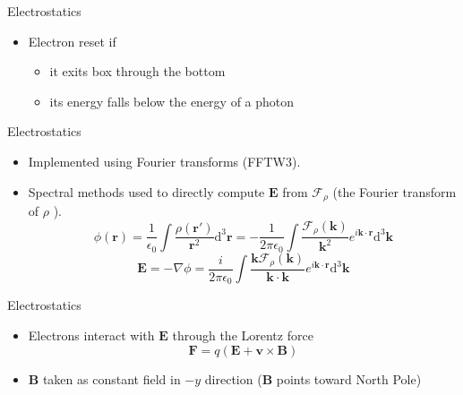 \documentclass[xcolor=pdftex,dvipsnames,table,usenames,11pt]{beamer}
\renewcommand{\vec}[1]{\ensuremath{\mathbf{#1}}}
\begin{document}
\begin{frame}{Electrostatics}
\begin{itemize}
\item Electron reset if
\begin{itemize}
\item it exits box through the bottom
\item its energy falls below the energy of a photon
\end{itemize}
\end{itemize}
\end{frame}

























\begin{frame}{Electrostatics}
\begin{itemize}
\item Implemented using Fourier transforms (FFTW3).
\item Spectral methods used to directly compute $\vec E$ from $\mathcal{F}_\rho$ (the Fourier transform of $\rho$ ).
\begin{equation*}
\phi(\vec r) = \frac{1}{\epsilon_0}\int{\frac{\rho(\vec r') }{\vec r^2  } \mathrm{d} ^3\vec r} = -\frac{1}{2\pi\epsilon_0}\int{ \frac{\mathcal{F}_\rho (\vec k)}{\vec k^2}e^{i\vec k\cdot\vec r }\mathrm{d}^3\vec k    }
\end{equation*}
\begin{equation*}
\vec E = -\nabla \phi  = \frac{i}{2\pi\epsilon_0}\int{   \frac{\vec k \mathcal{F}_\rho (\vec k)}{\vec k \cdot \vec k}e^{i\vec k\cdot\vec r }\mathrm{d}^3\vec k       }
\end{equation*}
\end{itemize}
\end{frame}











\begin{frame}{Electrostatics}
	\begin{itemize}
		\item Electrons interact with $\vec E$ through the Lorentz force
		\begin{equation*}
		\vec F = q(\vec E + \vec v \times \vec B)
		\end{equation*}
		\item \vec B taken as constant field in $-y$ direction (\vec B points toward North Pole)
\end{itemize}
\end{frame}
\end{document}
